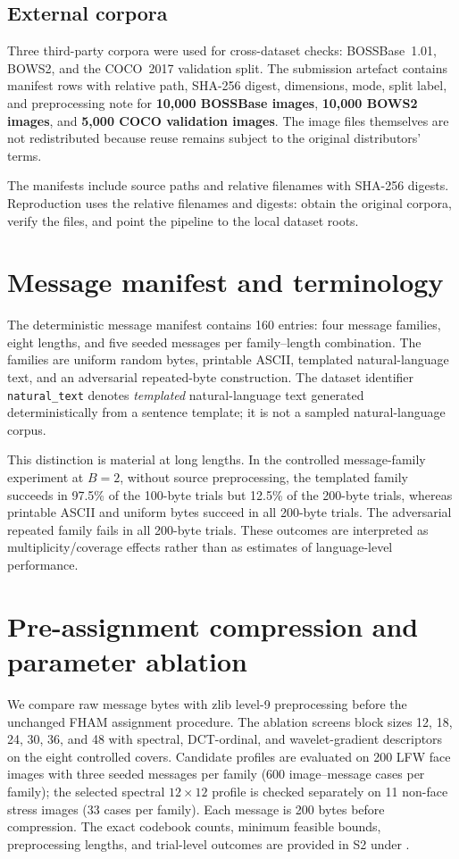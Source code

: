 ﻿\documentclass[11pt,a4paper]{article}
\newcommand{\code}[1]{\texttt{#1}}
\begin{document}
\subsection{External corpora}
Three third-party corpora were used for cross-dataset checks: BOSSBase~1.01, BOWS2, and the COCO~2017 validation split. The submission artefact contains manifest rows with relative path, SHA-256 digest, dimensions, mode, split label, and preprocessing note for \textbf{10,000 BOSSBase images}, \textbf{10,000 BOWS2 images}, and \textbf{5,000 COCO validation images}. The image files themselves are not redistributed because reuse remains subject to the original distributors' terms.

The manifests include source paths and relative filenames with SHA-256 digests. Reproduction uses the relative filenames and digests: obtain the original corpora, verify the files, and point the pipeline to the local dataset roots.

\section{Message manifest and terminology}
The deterministic message manifest contains 160 entries: four message families, eight lengths, and five seeded messages per family--length combination. The families are uniform random bytes, printable ASCII, templated natural-language text, and an adversarial repeated-byte construction. The dataset identifier \code{natural\_text} denotes \emph{templated} natural-language text generated deterministically from a sentence template; it is not a sampled natural-language corpus.

This distinction is material at long lengths. In the controlled message-family experiment at $B=2$, without source preprocessing, the templated family succeeds in 97.5\% of the 100-byte trials but 12.5\% of the 200-byte trials, whereas printable ASCII and uniform bytes succeed in all 200-byte trials. The adversarial repeated family fails in all 200-byte trials. These outcomes are interpreted as multiplicity/coverage effects rather than as estimates of language-level performance.

\section{Pre-assignment compression and parameter ablation}
We compare raw message bytes with zlib level-9 preprocessing before the
unchanged FHAM assignment procedure. The ablation screens block sizes 12, 18,
24, 30, 36, and 48 with spectral, DCT-ordinal, and wavelet-gradient
descriptors on the eight controlled covers. Candidate profiles are evaluated
on 200 LFW face images with three seeded messages per family (600
image--message cases per family); the selected spectral $12\times12$ profile
is checked separately on 11 non-face stress images (33 cases per family).
Each message is 200 bytes before compression. The exact codebook counts,
minimum feasible bounds, preprocessing lengths, and trial-level outcomes are
provided in S2 under
.
\end{document}
